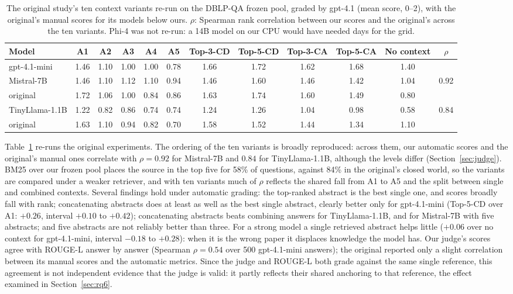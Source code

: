 \documentclass[conference]{IEEEtran}
\newcommand{\dq}{DBLP-QA}
\begin{document}
\begin{table}[t]
\caption{The original study's ten context variants re-run on the \dq{} frozen pool, graded by gpt-4.1
(mean score, 0--2), with the original's manual scores for its models below ours. $\rho$: Spearman rank
correlation between our scores and the original's across the ten variants. Phi-4 was not re-run: a
14B model on our CPU would have needed days for the grid.}
\label{tab:grid}
\centering\footnotesize
\setlength{\tabcolsep}{3.4pt}
\begin{tabular}{lcccccccccc|c}
\toprule
Model & A1 & A2 & A3 & A4 & A5 & Top-3-CD & Top-5-CD & Top-3-CA & Top-5-CA & No context & $\rho$ \\
\midrule
gpt-4.1-mini & 1.46 & 1.10 & 1.00 & 1.00 & 0.78 & 1.66 & 1.72 & 1.62 & 1.68 & 1.40 & \\
\midrule
Mistral-7B & 1.46 & 1.10 & 1.12 & 1.10 & 0.94 & 1.46 & 1.60 & 1.46 & 1.42 & 1.04 & 0.92 \\
\quad original & 1.72 & 1.06 & 1.00 & 0.84 & 0.86 & 1.63 & 1.74 & 1.60 & 1.49 & 0.80 & \\
TinyLlama-1.1B & 1.22 & 0.82 & 0.86 & 0.74 & 0.74 & 1.24 & 1.26 & 1.04 & 0.98 & 0.58 & 0.84 \\
\quad original & 1.63 & 1.10 & 0.94 & 0.82 & 0.70 & 1.58 & 1.52 & 1.44 & 1.34 & 1.10 & \\
\bottomrule
\end{tabular}
\end{table}

Table~\ref{tab:grid} re-runs the original experiments. The ordering of the ten variants is broadly
reproduced: across them, our automatic scores and the original's manual ones correlate with $\rho=0.92$ for
Mistral-7B and $0.84$ for TinyLlama-1.1B, although the levels differ (Section~\ref{sec:judge}). BM25 over
our frozen pool places the source in the top five for 58\% of questions, against 84\% in the original's
closed world, so the variants are compared under a weaker retriever, and with ten variants much of $\rho$
reflects the shared fall from A1 to A5 and the split between single and combined contexts. Several
findings hold under automatic grading: the top-ranked abstract is the best single one, and scores broadly
fall with rank; concatenating abstracts does at least as well as the best single abstract, clearly better
only for gpt-4.1-mini (Top-5-CD over A1: $+0.26$, interval $+0.10$ to $+0.42$); concatenating abstracts
beats combining answers for TinyLlama-1.1B, and for Mistral-7B with five abstracts; and five abstracts are
not reliably better than three. For a strong model a single retrieved abstract helps little ($+0.06$ over
no context for gpt-4.1-mini, interval $-0.18$ to $+0.28$): when it is the wrong paper it displaces
knowledge the model has. Our judge's scores agree with ROUGE-L answer by answer
(Spearman $\rho=0.54$ over 500 gpt-4.1-mini answers); the original reported only a slight correlation
between its manual scores and the automatic metrics. Since the judge and ROUGE-L both grade against the
same single reference, this agreement is not independent evidence that the judge is valid: it partly
reflects their shared anchoring to that reference, the effect examined in Section~\ref{sec:rq6}.
\end{document}
